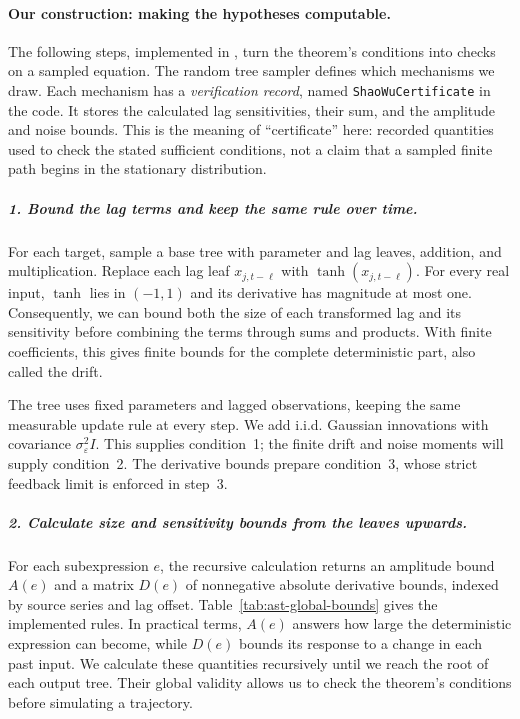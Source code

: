 \paragraph{Our construction: making the hypotheses computable.}
\label{sec:implemented-shao-wu-construction}

The following steps, implemented in
, turn the theorem's conditions into
checks on a sampled equation. The random tree sampler defines which mechanisms
we draw. Each mechanism has a \emph{verification record}, named
\texttt{ShaoWuCertificate} in the code. It stores the calculated lag
sensitivities, their sum, and the amplitude and noise bounds. This is the
meaning of ``certificate'' here: recorded quantities used to check the
stated sufficient conditions, not a claim that a sampled finite path begins
in the stationary distribution.

\subparagraph{1. Bound the lag terms and keep the same rule over time.}
For each target, sample a base tree with parameter and lag leaves, addition,
and multiplication. Replace each lag leaf $x_{j,t-\ell}$ with
$\tanh(x_{j,t-\ell})$. For every real input, $\tanh$ lies in $(-1,1)$ and
its derivative has magnitude at most one. Consequently, we can bound both
the size of each transformed lag and its sensitivity before combining the
terms through sums and products. With finite coefficients, this gives finite
bounds for the complete deterministic part, also called the drift.

The tree uses fixed parameters and lagged observations, keeping the same
measurable update rule at every step. We add i.i.d. Gaussian innovations with
covariance $\sigma_\varepsilon^2 I$. This supplies condition~1; the finite
drift and noise moments will supply condition~2. The derivative bounds prepare
condition~3, whose strict feedback limit is enforced in step~3.

\subparagraph{2. Calculate size and sensitivity bounds from the leaves upwards.}
For each subexpression $e$, the recursive calculation returns an amplitude
bound $A(e)$ and a matrix $D(e)$ of nonnegative absolute derivative bounds,
indexed by source series and lag offset. Table~\ref{tab:ast-global-bounds}
gives the implemented rules. In practical terms, $A(e)$ answers how large the
deterministic expression can become, while $D(e)$ bounds its response to a
change in each past input. We calculate these quantities recursively until
we reach the root of each output tree. Their global validity allows us to
check the theorem's conditions before simulating a trajectory.

